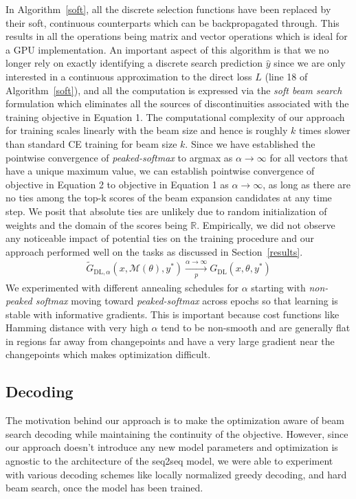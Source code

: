 \documentclass[letterpaper]{article} \usepackage{aaai18}  \usepackage{times}  \usepackage{helvet}  \usepackage{courier}  \usepackage{url}  \usepackage{graphicx}  \frenchspacing
\begin{document}
In Algorithm~\ref{soft}, all the discrete selection functions have been replaced by their soft, continuous counterparts which can be backpropagated through. This results in all the operations being matrix and vector operations which is ideal for a GPU implementation. An important aspect of this algorithm is that we no longer rely on exactly identifying a discrete search prediction $\hat{y}$ since we are only interested in a continuous approximation to the direct loss $L$ (line 18 of Algorithm~\ref{soft}), and all the computation is expressed via the \emph{soft beam search} formulation which eliminates all the sources of discontinuities associated with the training objective in Equation 1. The computational complexity of our approach for training scales linearly with the beam size and hence is roughly $k$ times slower than standard CE training for beam size $k$.
Since we have established the pointwise convergence of \emph{peaked-softmax} to argmax as $\alpha \to \infty$ for all vectors that have a unique maximum value, we can establish pointwise convergence of objective in Equation 2 to objective in Equation 1 as $\alpha \to \infty$, as long as there are no ties among the top-k scores of the beam expansion candidates at any time step. We posit that absolute ties are unlikely due to random initialization of weights and the domain of the scores being $\mathbb{R}$. Empirically, we did not observe any noticeable impact of potential ties on the training procedure and our approach performed well on the tasks as discussed in Section~\ref{results}.
\begin{align}
\tilde{G}_{\textrm{DL},\alpha}(x, \mathcal{M}(\theta), y^*) \xrightarrow[\textit{p}]{\alpha \to \infty} G_{\textrm{DL}}(x,\theta, y^*)
\end{align}
We experimented with different annealing schedules for $\alpha$ starting with \emph{non-peaked softmax} moving toward \emph{peaked-softmax} across epochs so that learning is stable with informative gradients. This is important because cost functions like Hamming distance with very high $\alpha$ tend to be non-smooth and are generally flat in regions far away from changepoints and have a very large gradient near the changepoints which makes optimization difficult.

\subsection{Decoding \label{decoding}}
The motivation behind our approach is to make the optimization aware of beam search decoding while maintaining the continuity of the objective. However, since our approach doesn't introduce any new model parameters and optimization is agnostic to the architecture of the seq2seq model, we were able to experiment with various decoding schemes like locally normalized greedy decoding, and hard beam search, once the model has been trained.
\end{document}
